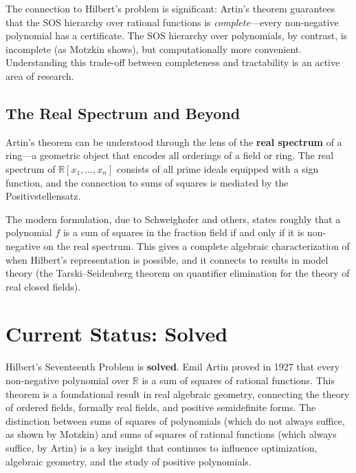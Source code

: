 The connection to Hilbert's problem is significant: Artin's theorem guarantees that the SOS hierarchy over rational functions is \emph{complete}---every non-negative polynomial has a certificate. The SOS hierarchy over polynomials, by contrast, is incomplete (as Motzkin shows), but computationally more convenient. Understanding this trade-off between completeness and tractability is an active area of research.

\subsection{The Real Spectrum and Beyond}

Artin's theorem can be understood through the lens of the \textbf{real spectrum} of a ring---a geometric object that encodes all orderings of a field or ring. The real spectrum of $\mathbb{R}[x_1, \ldots, x_n]$ consists of all prime ideals equipped with a sign function, and the connection to sums of squares is mediated by the Positivstellensatz.

The modern formulation, due to Schweighofer and others, states roughly that a polynomial $f$ is a sum of squares in the fraction field if and only if it is non-negative on the real spectrum. This gives a complete algebraic characterization of when Hilbert's representation is possible, and it connects to results in model theory (the Tarski--Seidenberg theorem on quantifier elimination for the theory of real closed fields).

\section{Current Status: Solved}

\begin{solvedbox}
Hilbert's Seventeenth Problem is \textbf{solved}. Emil Artin proved in 1927 that every non-negative polynomial over $\mathbb{R}$ is a sum of squares of rational functions. This theorem is a foundational result in real algebraic geometry, connecting the theory of ordered fields, formally real fields, and positive semidefinite forms. The distinction between sums of squares of polynomials (which do not always suffice, as shown by Motzkin) and sums of squares of rational functions (which always suffice, by Artin) is a key insight that continues to influence optimization, algebraic geometry, and the study of positive polynomials.
\end{solvedbox}

